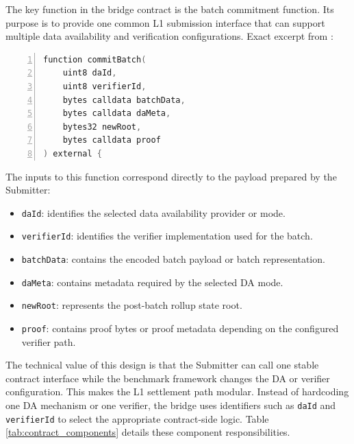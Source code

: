 The key function in the bridge contract is the batch commitment function. Its purpose is to provide one common L1 submission interface that can support multiple data availability and verification configurations.
\newpage
\noindent
Exact excerpt from :

\begin{lstlisting}[language=C, numbers=left, breaklines=true, basicstyle=\ttfamily\small]
function commitBatch(
    uint8 daId,
    uint8 verifierId,
    bytes calldata batchData,
    bytes calldata daMeta,
    bytes32 newRoot,
    bytes calldata proof
) external {
\end{lstlisting}

The inputs to this function correspond directly to the payload prepared by the Submitter:

\begin{itemize}
    \item \texttt{daId}: identifies the selected data availability provider or mode.
    \item \texttt{verifierId}: identifies the verifier implementation used for the batch.
    \item \texttt{batchData}: contains the encoded batch payload or batch representation.
    \item \texttt{daMeta}: contains metadata required by the selected DA mode.
    \item \texttt{newRoot}: represents the post-batch rollup state root.
    \item \texttt{proof}: contains proof bytes or proof metadata depending on the configured verifier path.
\end{itemize}

The technical value of this design is that the Submitter can call one stable contract interface while the benchmark framework changes the DA or verifier configuration. This makes the L1 settlement path modular. Instead of hardcoding one DA mechanism or one verifier, the bridge uses identifiers such as \texttt{daId} and \texttt{verifierId} to select the appropriate contract-side logic. Table \ref{tab:contract_components} details these component responsibilities.

